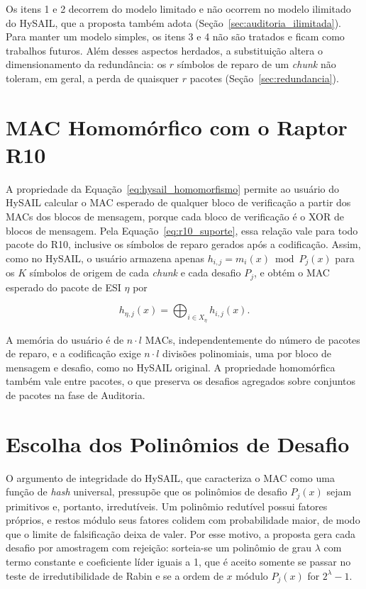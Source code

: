 Os itens 1 e 2 decorrem do modelo limitado e não ocorrem no modelo ilimitado do HySAIL, que a proposta também adota (Seção~\ref{sec:auditoria_ilimitada}). Para manter um modelo simples, os itens 3 e 4 não são tratados e ficam como trabalhos futuros. Além desses aspectos herdados, a substituição altera o dimensionamento da redundância: os $r$ símbolos de reparo de um \emph{chunk} não toleram, em geral, a perda de quaisquer $r$ pacotes (Seção~\ref{sec:redundancia}).

\section{MAC Homomórfico com o Raptor R10}
\label{sec:impacto_mac}

A propriedade da Equação~\eqref{eq:hysail_homomorfismo} permite ao usuário do HySAIL calcular o \acrshort{MAC} esperado de qualquer bloco de verificação a partir dos \acrshort{MAC}s dos blocos de mensagem, porque cada bloco de verificação é o XOR de blocos de mensagem. Pela Equação~\eqref{eq:r10_suporte}, essa relação vale para todo pacote do R10, inclusive os símbolos de reparo gerados após a codificação. Assim, como no HySAIL, o usuário armazena apenas $h_{i,j} = m_i(x) \bmod P_j(x)$ para os $K$ símbolos de origem de cada \emph{chunk} e cada desafio $P_j$, e obtém o \acrshort{MAC} esperado do pacote de \acrshort{ESI} $\eta$ por

\begin{equation}
	h_{\eta,j}(x) = \bigoplus_{i \in X_\eta} h_{i,j}(x).
	\label{eq:mac_derivado}
\end{equation}

A memória do usuário é de $n \cdot l$ \acrshort{MAC}s, independentemente do número de pacotes de reparo, e a codificação exige $n \cdot l$ divisões polinomiais, uma por bloco de mensagem e desafio, como no HySAIL original. A propriedade homomórfica também vale entre pacotes, o que preserva os desafios agregados sobre conjuntos de pacotes na fase de Auditoria.

\section{Escolha dos Polinômios de Desafio}

O argumento de integridade do HySAIL, que caracteriza o \acrshort{MAC} como uma função de \emph{hash} universal, pressupõe que os polinômios de desafio $P_j(x)$ sejam primitivos e, portanto, irredutíveis. Um polinômio redutível possui fatores próprios, e restos módulo seus fatores colidem com probabilidade maior, de modo que o limite de falsificação deixa de valer. Por esse motivo, a proposta gera cada desafio por amostragem com rejeição: sorteia-se um polinômio de grau $\lambda$ com termo constante e coeficiente líder iguais a 1, que é aceito somente se passar no teste de irredutibilidade de Rabin \cite{rabin1980probabilistic} e se a ordem de $x$ módulo $P_j(x)$ for $2^\lambda - 1$.

